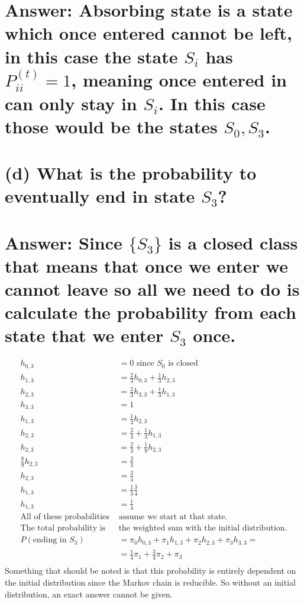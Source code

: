 \documentclass[11px]{article}
\begin{document}
\section*{Answer: Absorbing state is a state which once entered cannot be left, in this case the state $S_i$ has $P_{ii}^{(t)} = 1$, meaning once entered in can only stay in $S_i$. In this case those would be the states $S_0, S_3$.}

\section*{\normalfont (d) What is the probability to eventually end in state $S_3$?}

\section*{Answer: Since $\{S_3\}$ is a closed class that means that once we enter we cannot leave so all we need to do is calculate the probability from each state that we enter $S_3$ once.}

\begin{equation}
\begin{split}
h_{0,3} & = 0 \text{ since $S_0$ is closed} \\    
h_{1,3} & = \frac{2}{3} h_{0,3} + \frac{1}{3} h_{2,3} \\
h_{2,3} & = \frac{2}{3} h_{3,3} + \frac{1}{3} h_{1,3} \\
h_{3,3} & = 1 \\
h_{1,3} & = \frac{1}{3} h_{2,3} \\
h_{2,3} & = \frac{2}{3} + \frac{1}{3} h_{1,3} \\
h_{2,3} & = \frac{2}{3} + \frac{1}{9} h_{2,3} \\
\frac{8}{9} h_{2,3} & = \frac{2}{3} \\
h_{2,3} & = \frac{3}{4} \\
h_{1,3} & = \frac{1}{3} \frac{3}{4} \\
h_{1,3} & = \frac{1}{4} \\
\text{All of these probabilities } & \text{assume we start at that state.} \\
\text{The total probability is } & \text{the weighted sum with the initial distribution.} \\
P(\text{ending in } S_3) & = \pi_0 h_{0,3} + \pi_1 h_{1,3} + \pi_2 h_{2,3} + \pi_3 h_{3,3} = \\ 
& =\frac{1}{4} \pi_1 + \frac{3}{4} \pi_2 + \pi_3 \\
\end{split}
\end{equation}
Something that should be noted is that this probability is entirely dependent on the initial distribution since the Markov chain is reducible. So without an initial distribution, an exact answer cannot be given.
\end{document}
